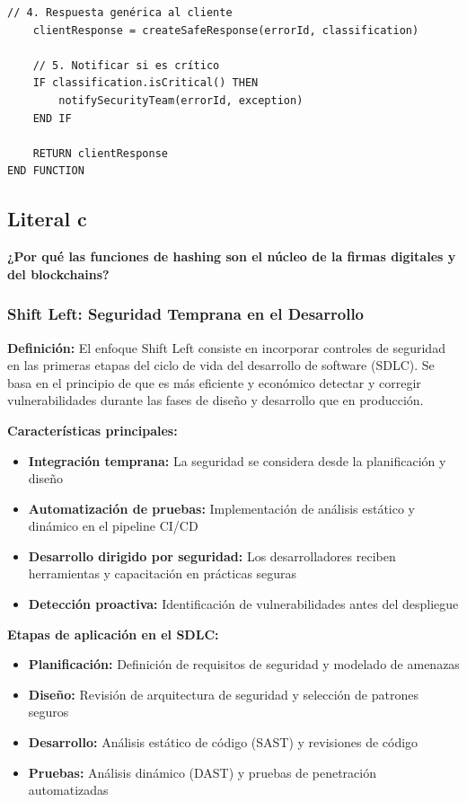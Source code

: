 {\begin{lstlisting}[language=pseudocode, caption=Manejo seguro de errores]
    // 4. Respuesta genérica al cliente
    clientResponse = createSafeResponse(errorId, classification)
    
    // 5. Notificar si es crítico
    IF classification.isCritical() THEN
        notifySecurityTeam(errorId, exception)
    END IF
    
    RETURN clientResponse
END FUNCTION
\end{lstlisting}





\subsection{Literal c}
\textbf{¿Por qué las funciones de hashing son el núcleo de la firmas digitales y del blockchains?}


\subsubsection{Shift Left: Seguridad Temprana en el Desarrollo}

\textbf{Definición:} El enfoque Shift Left consiste en incorporar controles de seguridad en las primeras etapas del ciclo de vida del desarrollo de software (SDLC). Se basa en el principio de que es más eficiente y económico detectar y corregir vulnerabilidades durante las fases de diseño y desarrollo que en producción.

\textbf{Características principales:}
\begin{itemize}
    \item \textbf{Integración temprana:} La seguridad se considera desde la planificación y diseño
    \item \textbf{Automatización de pruebas:} Implementación de análisis estático y dinámico en el pipeline CI/CD
    \item \textbf{Desarrollo dirigido por seguridad:} Los desarrolladores reciben herramientas y capacitación en prácticas seguras
    \item \textbf{Detección proactiva:} Identificación de vulnerabilidades antes del despliegue
\end{itemize}

\textbf{Etapas de aplicación en el SDLC:}
\begin{itemize}
    \item \textbf{Planificación:} Definición de requisitos de seguridad y modelado de amenazas
    \item \textbf{Diseño:} Revisión de arquitectura de seguridad y selección de patrones seguros
    \item \textbf{Desarrollo:} Análisis estático de código (SAST) y revisiones de código
    \item \textbf{Pruebas:} Análisis dinámico (DAST) y pruebas de penetración automatizadas
\end{itemize}

}

